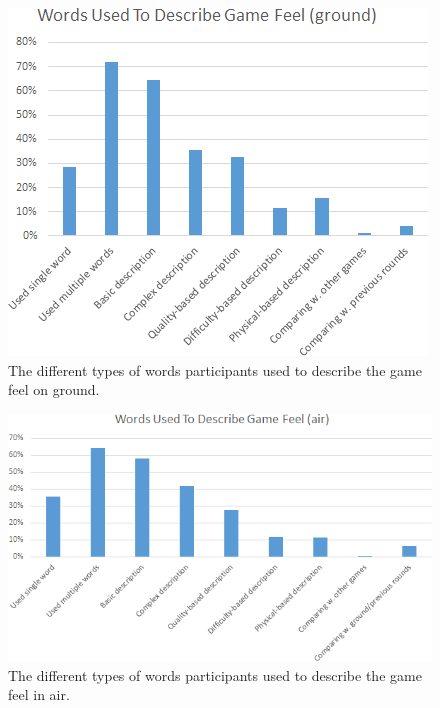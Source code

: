 \begin{figure}[htbp]
\centering
\includegraphics[width=\columnwidth]{Pics/coding1}
\caption{The different types of words participants used to describe the game feel on ground.}
\label{fig:coding1}
\end{figure}

\begin{figure}[htbp]
\centering
\includegraphics[width=\columnwidth]{Pics/coding2}
\caption{The different types of words participants used to describe the game feel in air.}
\label{fig:coding2}
\end{figure}


